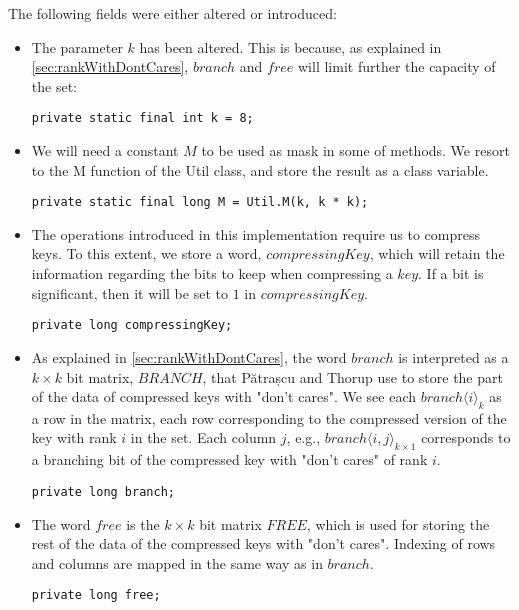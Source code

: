 The following fields were either altered or introduced:
\begin{itemize}
    \item
    The parameter $k$ has been altered. This is because, as explained in \ref{sec:rankWithDontCares}, $branch$ and $free$ will limit further the capacity of the set:
    \begin{lstlisting}
private static final int k = 8;
    \end{lstlisting}
    
    \item
    We will need a constant $M$ to be used as mask in some of methods. We resort to the {\ttfamily M} function of the {\ttfamily Util} class, and store the result as a class variable.
    \begin{lstlisting}
private static final long M = Util.M(k, k * k);
    \end{lstlisting}

    \item
    The operations introduced in this implementation require us to compress keys. To this extent, we store a word, $compressingKey$, which will retain the information regarding the bits to keep when compressing a $key$. If a bit is significant, then it will be set to $1$ in $compressingKey$.
    \begin{lstlisting}
private long compressingKey;
    \end{lstlisting}

    \item
    As explained in \ref{sec:rankWithDontCares}, the word $branch$ is interpreted as a $k \times k$ bit matrix, $BRANCH$, that Pătrașcu and Thorup use to store the part of the data of compressed keys with "don't cares".
    We see each $branch\langle i \rangle_k$ as a row in the matrix, each row corresponding to the compressed version of the key with rank $i$ in the set.
    Each column $j$, e.g., $branch\langle i, j\rangle_{k \times 1}$ corresponds to a branching bit of the compressed key with "don't cares" of rank $i$.
    \begin{lstlisting}
private long branch;
    \end{lstlisting}
    
    \item
    The word $free$ is the $k \times k$ bit matrix $FREE$, which is used for storing the rest of the data of the compressed keys with "don't cares". Indexing of rows and columns are mapped in the same way as in $branch$.
    \begin{lstlisting}
private long free;
    \end{lstlisting}
\end{itemize}

